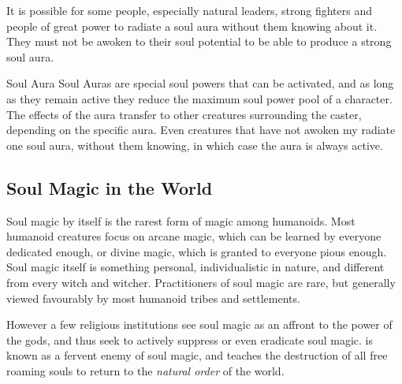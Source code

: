 It is possible for some people, especially natural leaders, strong fighters
and people of great power to radiate a soul aura without them knowing about it.
They must not be awoken to their soul potential to be able to produce a strong
soul aura.

\begin{35e}{Soul Aura}
  Soul Auras are special soul powers that can be activated, and as long as
  they remain active they reduce the maximum soul power pool of a
  character. The effects of the aura transfer to other creatures surrounding
  the caster, depending on the specific aura. Even creatures that have not
  awoken my radiate one soul aura, without them knowing, in which case the
  aura is always active.
\end{35e}

\subsection{Soul Magic in the World}
\label{sec:Soul Magic in the World}

Soul magic by itself is the rarest form of magic among humanoids. Most humanoid
creatures focus on arcane magic, which can be learned by everyone dedicated
enough, or divine magic, which is granted to everyone pious enough. Soul magic
itself is something personal, individualistic in nature, and different from
every witch and witcher. Practitioners of soul magic are rare, but generally
viewed favourably by most humanoid tribes and settlements.

However a few religious institutions see soul magic as an affront to the power
of the gods, and thus seek to actively suppress or even eradicate soul magic.
 is known as a fervent enemy of soul magic, and teaches the
destruction of all free roaming souls to return to the \emph{natural order} of
the world.